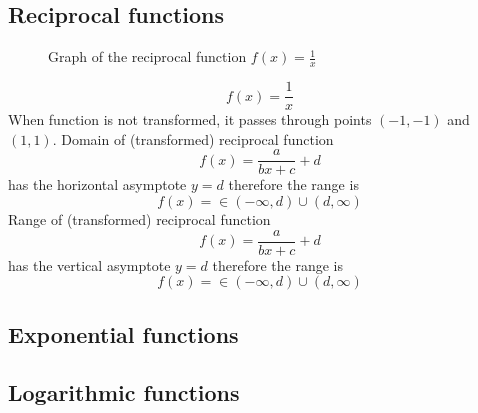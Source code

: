 \documentclass{article}
\begin{document}
\subsection{Reciprocal functions}

\begin{figure}
  \centering
  \caption{Graph of the reciprocal function $f(x) = \frac{1}{x}$}
\end{figure}


\begin{equation}
  f(x) = \frac{1}{x}
\end{equation}
When function is not transformed, it passes through points $(-1, -1)$ and $(1, 1)$.
Domain of (transformed) reciprocal function
\begin{equation}
  f(x) = \frac{a}{bx+c} + d
\end{equation}
has the horizontal asymptote $y = d$ therefore the range is
\begin{equation}
  f(x) = \in (-\infty, d) \cup (d, \infty)
\end{equation}
Range of (transformed) reciprocal function
\begin{equation}
  f(x) = \frac{a}{bx+c} + d
\end{equation}
has the vertical asymptote $y = d$ therefore the range is
\begin{equation}
  f(x) = \in (-\infty, d) \cup (d, \infty)
\end{equation}


\subsection{Exponential functions}
\subsection{Logarithmic functions}
\end{document}

